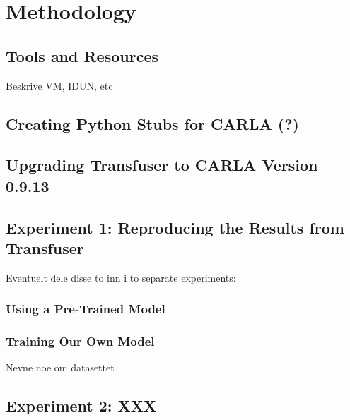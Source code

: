 \chapter{Methodology}
\label{chap:method}



\section{Tools and Resources}
Beskrive VM, IDUN, etc


\section{Creating Python Stubs for CARLA (?)}


\section{Upgrading Transfuser to CARLA Version 0.9.13}


\section{Experiment 1: Reproducing the Results from Transfuser}
Eventuelt dele disse to inn i to separate experiments:

\subsection{Using a Pre-Trained Model}

\subsection{Training Our Own Model}
Nevne noe om datasettet


\section{Experiment 2: XXX}
